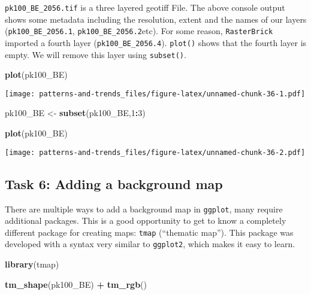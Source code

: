 \documentclass[]{book}
\newenvironment{Shaded}{\begin{snugshade}}{\end{snugshade}}
\newcommand{\DecValTok}[1]{\textcolor[rgb]{0.00,0.00,0.81}{#1}}
\newcommand{\KeywordTok}[1]{\textcolor[rgb]{0.13,0.29,0.53}{\textbf{#1}}}
\newcommand{\NormalTok}[1]{#1}
\newcommand{\OperatorTok}[1]{\textcolor[rgb]{0.81,0.36,0.00}{\textbf{#1}}}
\newcommand{\StringTok}[1]{\textcolor[rgb]{0.31,0.60,0.02}{#1}}
\begin{document}
\texttt{pk100\_BE\_2056.tif} is a three layered geotiff File. The above console output shows some metadata including the resolution, extent and the names of our layers (\texttt{pk100\_BE\_2056.1}, \texttt{pk100\_BE\_2056.2}etc). For some reason, \texttt{RasterBrick} imported a fourth layer (\texttt{pk100\_BE\_2056.4}). \texttt{plot()} shows that the fourth layer is empty. We will remove this layer using \texttt{subset()}.

\begin{Shaded}
\begin{Highlighting}[]

\KeywordTok{plot}\NormalTok{(pk100_BE)}
\end{Highlighting}
\end{Shaded}

\texttt{[image: patterns-and-trends\_files/figure-latex/unnamed-chunk-36-1.pdf]}

\begin{Shaded}
\begin{Highlighting}[]

\NormalTok{pk100_BE <-}\StringTok{ }\KeywordTok{subset}\NormalTok{(pk100_BE,}\DecValTok{1}\OperatorTok{:}\DecValTok{3}\NormalTok{)}

\KeywordTok{plot}\NormalTok{(pk100_BE)}
\end{Highlighting}
\end{Shaded}

\texttt{[image: patterns-and-trends\_files/figure-latex/unnamed-chunk-36-2.pdf]}

\hypertarget{task-6-adding-a-background-map}{%
\subsection{Task 6: Adding a background map}\label{task-6-adding-a-background-map}}

There are multiple ways to add a background map in \texttt{ggplot}, many require additional packages. This is a good opportunity to get to know a completely different package for creating maps: \texttt{tmap} (``thematic map''). This package was developed with a syntax very similar to \texttt{ggplot2}, which makes it easy to learn.

\begin{Shaded}
\begin{Highlighting}[]
\KeywordTok{library}\NormalTok{(tmap)}


\KeywordTok{tm_shape}\NormalTok{(pk100_BE) }\OperatorTok{+}\StringTok{ }
\StringTok{  }\KeywordTok{tm_rgb}\NormalTok{() }
\end{Highlighting}
\end{Shaded}
\end{document}
